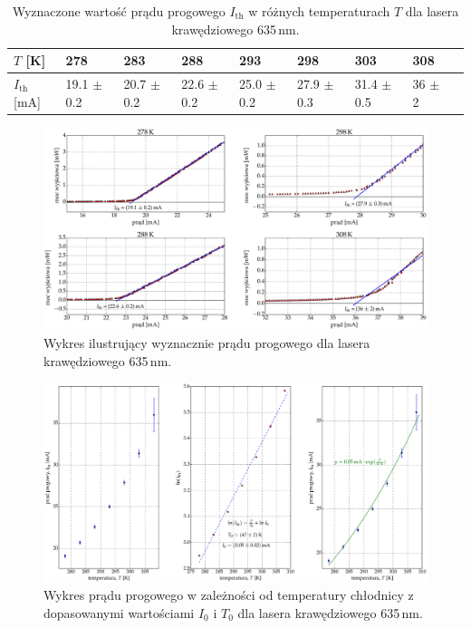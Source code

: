 \begin{table}[H]
\begin{center}
\caption{Wyznaczone wartość prądu progowego $I_{\mathrm{th}}$ w różnych temperaturach $T$ dla lasera krawędziowego 635\,nm. }
\begin{tabular}{ | C{1.5cm}|  C{1.5cm} | C{1.5cm} | C{1.5cm}| C{1.5cm} | C{1.5cm}| C{1.5cm}| C{2.0cm}| C{2.0cm}|}
\hline
$T$ [K] 	&   278 & 283  	& 288 & 293 & 298 & 303 & 308 \\ \hline
$I_{\mathrm{th}}$ [mA]  &	19.1 $\pm$ 0.2  & 20.7 $\pm$ 0.2 & 22.6 $\pm$ 0.2 &
25.0 $\pm$ 0.2  & 27.9 $\pm$ 0.3 & 31.4 $\pm$ 0.5 & 36 $\pm$ 2	\\ \hline
\end{tabular}
\label{tab:tabela_635}
\end{center}
\end{table}
\begin{figure}[H]
\center
  \includegraphics[scale=0.30]{plot635/plot_i_th_4.eps}
  \caption{Wykres ilustrujący wyznacznie prądu progowego dla lasera krawędziowego 635\,nm.}
  \label{fig:plot_i_th_4}
\end{figure}
\begin{figure}
\center
  \includegraphics[scale=0.30]{plot635/plot_fit.eps}
  \caption{Wykres prądu progowego w zależności od temperatury chłodnicy z dopasowanymi wartościami $I_{0}$ i $T_{0}$ dla lasera krawędziowego 635\,nm.}
  \label{fig:plot_fit}
\end{figure}
